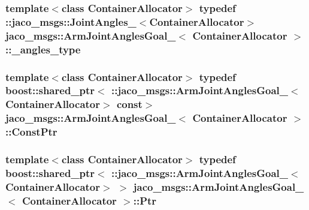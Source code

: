 \subsubsection[{\texorpdfstring{\+\_\+angles\+\_\+type}{_angles_type}}]{\setlength{\rightskip}{0pt plus 5cm}template$<$class Container\+Allocator$>$ typedef \+::{\bf jaco\+\_\+msgs\+::\+Joint\+Angles\+\_\+}$<$Container\+Allocator$>$ {\bf jaco\+\_\+msgs\+::\+Arm\+Joint\+Angles\+Goal\+\_\+}$<$ Container\+Allocator $>$\+::{\bf \+\_\+angles\+\_\+type}}\hypertarget{structjaco__msgs_1_1ArmJointAnglesGoal___a426455ca4fced1b01435e33341594a89}{}\label{structjaco__msgs_1_1ArmJointAnglesGoal___a426455ca4fced1b01435e33341594a89}
\subsubsection[{\texorpdfstring{Const\+Ptr}{ConstPtr}}]{\setlength{\rightskip}{0pt plus 5cm}template$<$class Container\+Allocator$>$ typedef boost\+::shared\+\_\+ptr$<$ \+::{\bf jaco\+\_\+msgs\+::\+Arm\+Joint\+Angles\+Goal\+\_\+}$<$Container\+Allocator$>$ const$>$ {\bf jaco\+\_\+msgs\+::\+Arm\+Joint\+Angles\+Goal\+\_\+}$<$ Container\+Allocator $>$\+::{\bf Const\+Ptr}}\hypertarget{structjaco__msgs_1_1ArmJointAnglesGoal___abf158f2a2307be9fcece9beafd8ac487}{}\label{structjaco__msgs_1_1ArmJointAnglesGoal___abf158f2a2307be9fcece9beafd8ac487}
\subsubsection[{\texorpdfstring{Ptr}{Ptr}}]{\setlength{\rightskip}{0pt plus 5cm}template$<$class Container\+Allocator$>$ typedef boost\+::shared\+\_\+ptr$<$ \+::{\bf jaco\+\_\+msgs\+::\+Arm\+Joint\+Angles\+Goal\+\_\+}$<$Container\+Allocator$>$ $>$ {\bf jaco\+\_\+msgs\+::\+Arm\+Joint\+Angles\+Goal\+\_\+}$<$ Container\+Allocator $>$\+::{\bf Ptr}}\hypertarget{structjaco__msgs_1_1ArmJointAnglesGoal___ab14f4b3081fbaa18adc43013e0250060}{}\label{structjaco__msgs_1_1ArmJointAnglesGoal___ab14f4b3081fbaa18adc43013e0250060}
